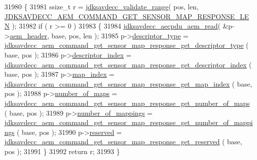 \begin{DoxyCode}
31980 \{
31981     ssize\_t r = \hyperlink{group__util_ga9c02bdfe76c69163647c3196db7a73a1}{jdksavdecc\_validate\_range}( pos, len, 
      \hyperlink{group__command__get__sensor__map__response_ga14b166ca3e73b9e45243bf631064589c}{JDKSAVDECC\_AEM\_COMMAND\_GET\_SENSOR\_MAP\_RESPONSE\_LEN} );
31982     \textcolor{keywordflow}{if} ( r >= 0 )
31983     \{
31984         \hyperlink{group__aecpdu__aem_gae2421015dcdce745b4f03832e12b4fb6}{jdksavdecc\_aecpdu\_aem\_read}( &p->\hyperlink{structjdksavdecc__aem__command__get__sensor__map__response_ae1e77ccb75ff5021ad923221eab38294}{aem\_header}, base, pos, len );
31985         p->\hyperlink{structjdksavdecc__aem__command__get__sensor__map__response_ab7c32b6c7131c13d4ea3b7ee2f09b78d}{descriptor\_type} = 
      \hyperlink{group__command__get__sensor__map__response_ga31dd1d19c268d1e00c14a6b8b545c0a4}{jdksavdecc\_aem\_command\_get\_sensor\_map\_response\_get\_descriptor\_type}
      ( base, pos );
31986         p->\hyperlink{structjdksavdecc__aem__command__get__sensor__map__response_a042bbc76d835b82d27c1932431ee38d4}{descriptor\_index} = 
      \hyperlink{group__command__get__sensor__map__response_ga765f284ee393d086444f6b160300abac}{jdksavdecc\_aem\_command\_get\_sensor\_map\_response\_get\_descriptor\_index}
      ( base, pos );
31987         p->\hyperlink{structjdksavdecc__aem__command__get__sensor__map__response_a3a5e0547986898ad64c07f238d8b7bcf}{map\_index} = 
      \hyperlink{group__command__get__sensor__map__response_ga1cb86ddeaece9a1c0eb172e94e97bd5b}{jdksavdecc\_aem\_command\_get\_sensor\_map\_response\_get\_map\_index}
      ( base, pos );
31988         p->\hyperlink{structjdksavdecc__aem__command__get__sensor__map__response_a6d00316ed943197ab46c0af22c1d430a}{number\_of\_maps} = 
      \hyperlink{group__command__get__sensor__map__response_gad233cd1aceed8d0174389b4185f515d2}{jdksavdecc\_aem\_command\_get\_sensor\_map\_response\_get\_number\_of\_maps}
      ( base, pos );
31989         p->\hyperlink{structjdksavdecc__aem__command__get__sensor__map__response_ac7db472c5622ef473d5d0a5c416d5531}{number\_of\_mappings} = 
      \hyperlink{group__command__get__sensor__map__response_ga4139555b27dba321ad55f223030ec776}{jdksavdecc\_aem\_command\_get\_sensor\_map\_response\_get\_number\_of\_mappings}
      ( base, pos );
31990         p->\hyperlink{structjdksavdecc__aem__command__get__sensor__map__response_a5a6ed8c04a3db86066924b1a1bf4dad3}{reserved} = 
      \hyperlink{group__command__get__sensor__map__response_gaccf1b4ee6da57af0e80a220a959c3243}{jdksavdecc\_aem\_command\_get\_sensor\_map\_response\_get\_reserved}
      ( base, pos );
31991     \}
31992     \textcolor{keywordflow}{return} r;
31993 \}
\end{DoxyCode}


